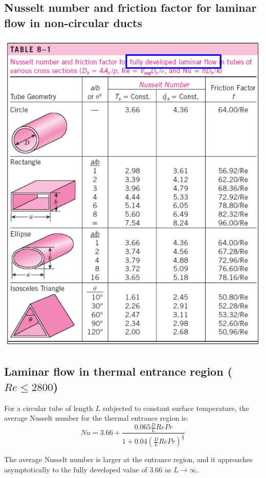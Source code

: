 \documentclass[11pt]{article}
\begin{document}
\subsection{Nusselt number and friction factor for laminar flow in non-circular ducts}
\label{sec:org1f8ab39}
\begin{center}
\includegraphics[width=.9\linewidth]{./images/laminar-flow-in-non-circular-ducts-table.png}
\end{center}

 \newpage

\subsection{Laminar flow in thermal entrance region (\(Re \le 2800\))}
\label{sec:org5a81556}
For a circular tube of length \(L\) subjected to constant surface temperature, the average Nusselt number for the thermal entrance region is:
\[Nu = 3.66 + \frac{0.065 \frac{D}{L} Re Pr}{1 + 0.04 \left(\frac{D}{L} Re Pr \right)^{\frac{2}{3}}}\]

The average Nusselt number is larger at the entrance region, and it approaches asymptotically to the fully developed value of \(3.66\) as \(L \rightarrow \infty\).
\end{document}
